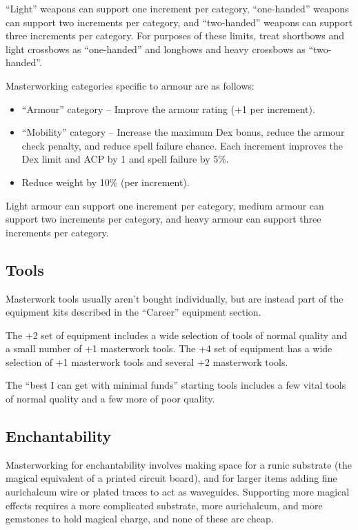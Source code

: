 ``Light'' weapons can support one increment per category, ``one-handed''
weapons can support two increments per category, and ``two-handed'' weapons
can support three increments per category. For purposes of these limits,
treat shortbows and light crossbows as ``one-handed'' and longbows and
heavy crossbows as ``two-handed''.

Masterworking categories specific to armour are as follows:
\begin{itemize}
\item ``Armour'' category -- Improve the armour rating (+1 per increment).
\item ``Mobility'' category -- Increase the maximum Dex bonus, reduce the
armour check penalty, and reduce spell failure chance. Each increment
improves the Dex limit and ACP by 1 and spell failure by 5\%.
\item Reduce weight by 10\% (per increment).
\end{itemize}

Light armour can support one increment per category, medium armour can
support two increments per category, and heavy armour can support three
increments per category.
%

%
\subsection{Tools}

Masterwork tools usually aren't bought individually, but are instead part
of the equipment kits described in the ``Career'' equipment section.

The +2 set of equipment includes a wide selection of tools of normal
quality and a small number of +1 masterwork tools. The +4 set of equipment
has a wide selection of +1 masterwork tools and several +2 masterwork tools.

The ``best I can get with minimal funds'' starting tools includes a few
vital tools of normal quality and a few more of poor quality.
%

%
\subsection{Enchantability}

Masterworking for enchantability involves making space for a runic substrate
(the magical equivalent of a printed circuit board), and for larger items
adding fine aurichalcum wire or plated traces to act as waveguides.
Supporting more magical effects requires a more complicated substrate, more
aurichalcum, and more gemstones to hold magical charge, and none of these
are cheap.


